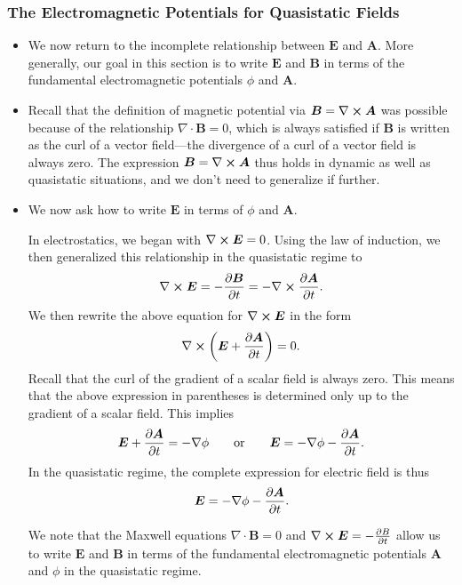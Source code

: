 \documentclass[11pt, a4paper]{article}
\renewcommand{\vec}[1]{\bm{#1}} %
\newcommand{\E}{\vec{E}} %
\newcommand{\B}{\vec{B}} %
\newcommand{\A}{\vec{A}} %
\renewcommand{\div}{\nabla \cdot}
\renewcommand{\curl}{\nabla \cross}
\renewcommand{\grad}{\nabla}
\begin{document}
\subsubsection{The Electromagnetic Potentials for Quasistatic Fields}
\begin{itemize}
	\item We now return to the incomplete relationship between $ \E $ and $ \A $. More generally, our goal in this section is to write $ \E $ and $ \B $ in terms of the fundamental electromagnetic potentials $ \phi $ and $ \A $.
	
    \item Recall that the definition of magnetic potential via $ \B = \curl \A $ was possible because of the relationship $ \div \B = 0 $, which is always satisfied if $ \B $ is written as the curl of a vector field---the divergence of a curl of a vector field is always zero. The expression $ \B = \curl \A $ thus holds in dynamic as well as quasistatic situations, and we don't need to generalize if further.

	\item We now ask how to write $ \E $ in terms of $ \phi $ and $ \A $. 

    In electrostatics, we began with $ \curl \E = 0 $. Using the law of induction, we then generalized this relationship in the quasistatic regime to
	\begin{equation*}
		\curl \E = - \pdv{\B}{t} = - \curl \pdv{\A}{t}.
	\end{equation*}
    We then rewrite the above equation for $ \curl \E $ in the form
	\begin{equation*}
		\curl \left(\E + \pdv{\A}{t}\right) = 0.
	\end{equation*}
	Recall that the curl of the gradient of a scalar field is always zero. This means that the above expression in parentheses is determined only up to the gradient of a scalar field. This implies
	\begin{equation*}
        \E + \pdv{\A}{t} = - \grad \phi \qquad \text{or} \qquad \E = - \grad \phi - \pdv{\A}{t}.
	\end{equation*} 
	In the quasistatic regime, the complete expression for electric field is thus
	\begin{equation*}
		\E = - \grad \phi - \pdv{\A}{t}.
	\end{equation*}
	
    We note that the Maxwell equations $ \div \B = 0 $ and $ \curl \E = - \pdv{B}{t} $ allow us to write $ \E $ and $ \B $ in terms of the fundamental electromagnetic potentials $ \A $ and $ \phi $ in the quasistatic regime. 
	
\end{itemize}
\end{document}
